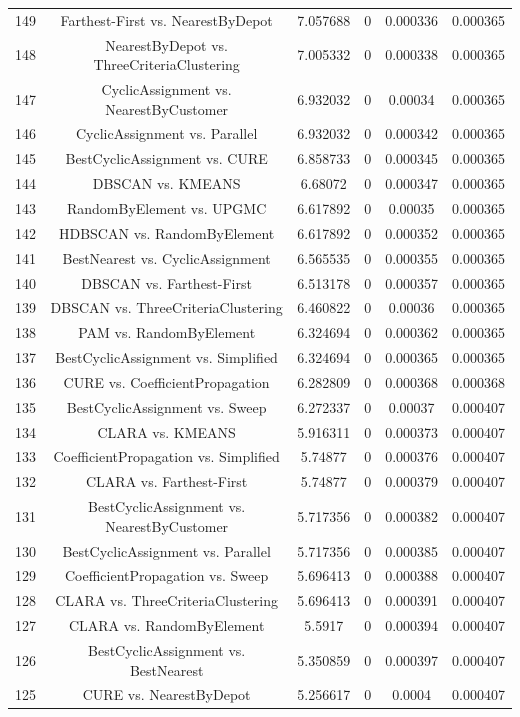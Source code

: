\documentclass[a4paper,10pt]{article}
\begin{document}
\begin{landscape}
\begin{table}[!htp]
\begin{tabular}{cccccc}
149&Farthest-First vs. NearestByDepot&7.057688&0&0.000336&0.000365\\
148&NearestByDepot vs. ThreeCriteriaClustering&7.005332&0&0.000338&0.000365\\
147&CyclicAssignment vs. NearestByCustomer&6.932032&0&0.00034&0.000365\\
146&CyclicAssignment vs. Parallel&6.932032&0&0.000342&0.000365\\
145&BestCyclicAssignment vs. CURE&6.858733&0&0.000345&0.000365\\
144&DBSCAN vs. KMEANS&6.68072&0&0.000347&0.000365\\
143&RandomByElement vs. UPGMC&6.617892&0&0.00035&0.000365\\
142&HDBSCAN vs. RandomByElement&6.617892&0&0.000352&0.000365\\
141&BestNearest vs. CyclicAssignment&6.565535&0&0.000355&0.000365\\
140&DBSCAN vs. Farthest-First&6.513178&0&0.000357&0.000365\\
139&DBSCAN vs. ThreeCriteriaClustering&6.460822&0&0.00036&0.000365\\
138&PAM vs. RandomByElement&6.324694&0&0.000362&0.000365\\
137&BestCyclicAssignment vs. Simplified&6.324694&0&0.000365&0.000365\\
136&CURE vs. CoefficientPropagation&6.282809&0&0.000368&0.000368\\
135&BestCyclicAssignment vs. Sweep&6.272337&0&0.00037&0.000407\\
134&CLARA vs. KMEANS&5.916311&0&0.000373&0.000407\\
133&CoefficientPropagation vs. Simplified&5.74877&0&0.000376&0.000407\\
132&CLARA vs. Farthest-First&5.74877&0&0.000379&0.000407\\
131&BestCyclicAssignment vs. NearestByCustomer&5.717356&0&0.000382&0.000407\\
130&BestCyclicAssignment vs. Parallel&5.717356&0&0.000385&0.000407\\
129&CoefficientPropagation vs. Sweep&5.696413&0&0.000388&0.000407\\
128&CLARA vs. ThreeCriteriaClustering&5.696413&0&0.000391&0.000407\\
127&CLARA vs. RandomByElement&5.5917&0&0.000394&0.000407\\
126&BestCyclicAssignment vs. BestNearest&5.350859&0&0.000397&0.000407\\
125&CURE vs. NearestByDepot&5.256617&0&0.0004&0.000407\\

\end{tabular}
\end{table}
\end{landscape}
\end{document}
